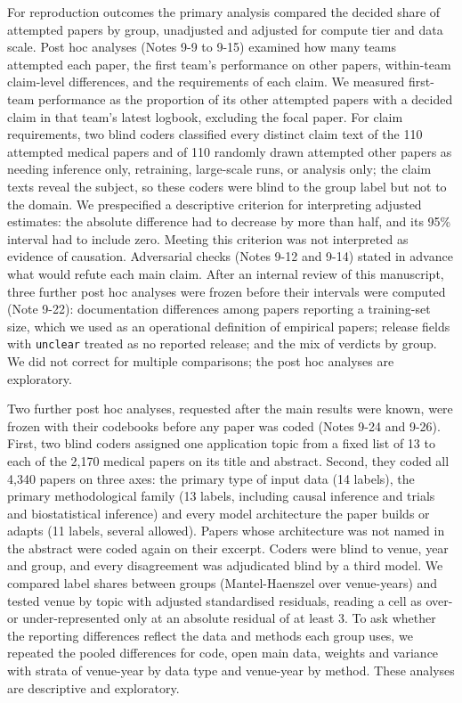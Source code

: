 \documentclass[11pt]{article}
\begin{document}
For reproduction outcomes the primary analysis compared the decided share of attempted papers by group, unadjusted and adjusted for compute tier and data scale. Post hoc analyses (Notes 9-9 to 9-15) examined how many teams attempted each paper, the first team's performance on other papers, within-team claim-level differences, and the requirements of each claim. We measured first-team performance as the proportion of its other attempted papers with a decided claim in that team's latest logbook, excluding the focal paper. For claim requirements, two blind coders classified every distinct claim text of the 110 attempted medical papers and of 110 randomly drawn attempted other papers as needing inference only, retraining, large-scale runs, or analysis only; the claim texts reveal the subject, so these coders were blind to the group label but not to the domain. We prespecified a descriptive criterion for interpreting adjusted estimates: the absolute difference had to decrease by more than half, and its 95\% interval had to include zero. Meeting this criterion was not interpreted as evidence of causation. Adversarial checks (Notes 9-12 and 9-14) stated in advance what would refute each main claim. After an internal review of this manuscript, three further post hoc analyses were frozen before their intervals were computed (Note 9-22): documentation differences among papers reporting a training-set size, which we used as an operational definition of empirical papers; release fields with \texttt{unclear} treated as no reported release; and the mix of verdicts by group. We did not correct for multiple comparisons; the post hoc analyses are exploratory.

Two further post hoc analyses, requested after the main results were known, were frozen with their codebooks before any paper was coded (Notes 9-24 and 9-26). First, two blind coders assigned one application topic from a fixed list of 13 to each of the 2,170 medical papers on its title and abstract. Second, they coded all 4,340 papers on three axes: the primary type of input data (14 labels), the primary methodological family (13 labels, including causal inference and trials and biostatistical inference) and every model architecture the paper builds or adapts (11 labels, several allowed). Papers whose architecture was not named in the abstract were coded again on their excerpt. Coders were blind to venue, year and group, and every disagreement was adjudicated blind by a third model. We compared label shares between groups (Mantel-Haenszel over venue-years) and tested venue by topic with adjusted standardised residuals, reading a cell as over- or under-represented only at an absolute residual of at least 3. To ask whether the reporting differences reflect the data and methods each group uses, we repeated the pooled differences for code, open main data, weights and variance with strata of venue-year by data type and venue-year by method. These analyses are descriptive and exploratory.
\end{document}
